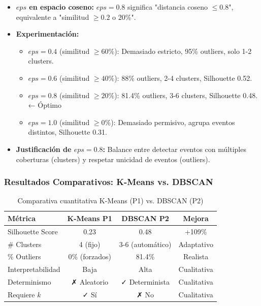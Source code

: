 \begin{itemize}
    \item \textbf{$eps$ en espacio coseno:} $eps = 0.8$ significa "distancia coseno $\leq 0.8$", equivalente a "similitud $\geq 0.2$ o 20\%".
    
    \item \textbf{Experimentación:}
    \begin{itemize}
        \item $eps=0.4$ (similitud $\geq 60\%$): Demasiado estricto, 95\% outliers, solo 1-2 clusters.
        \item $eps=0.6$ (similitud $\geq 40\%$): 88\% outliers, 2-4 clusters, Silhouette 0.52.
        \item $eps=0.8$ (similitud $\geq 20\%$): 81.4\% outliers, 3-6 clusters, Silhouette 0.48. ← Óptimo
        \item $eps=1.0$ (similitud $\geq 0\%$): Demasiado permisivo, agrupa eventos distintos, Silhouette 0.31.
    \end{itemize}
    
    \item \textbf{Justificación de $eps=0.8$:} Balance entre detectar eventos con múltiples coberturas (clusters) y respetar unicidad de eventos (outliers).
\end{itemize}

\subsubsection{Resultados Comparativos: K-Means vs. DBSCAN}

\begin{table}[h]
\centering
\caption{Comparativa cuantitativa K-Means (P1) vs. DBSCAN (P2)}
\begin{tabular}{|l|c|c|c|}
\hline
\textbf{Métrica} & \textbf{K-Means P1} & \textbf{DBSCAN P2} & \textbf{Mejora} \\ \hline
Silhouette Score & 0.23 & 0.48 & +109\% \\ \hline
\# Clusters & 4 (fijo) & 3-6 (automático) & Adaptativo \\ \hline
\% Outliers & 0\% (forzados) & 81.4\% & Realista \\ \hline
Interpretabilidad & Baja & Alta & Cualitativa \\ \hline
Determinismo & ✗ Aleatorio & ✓ Determinista & Cualitativa \\ \hline
Requiere $k$ & ✓ Sí & ✗ No & Cualitativa \\ \hline
\end{tabular}
\end{table}

